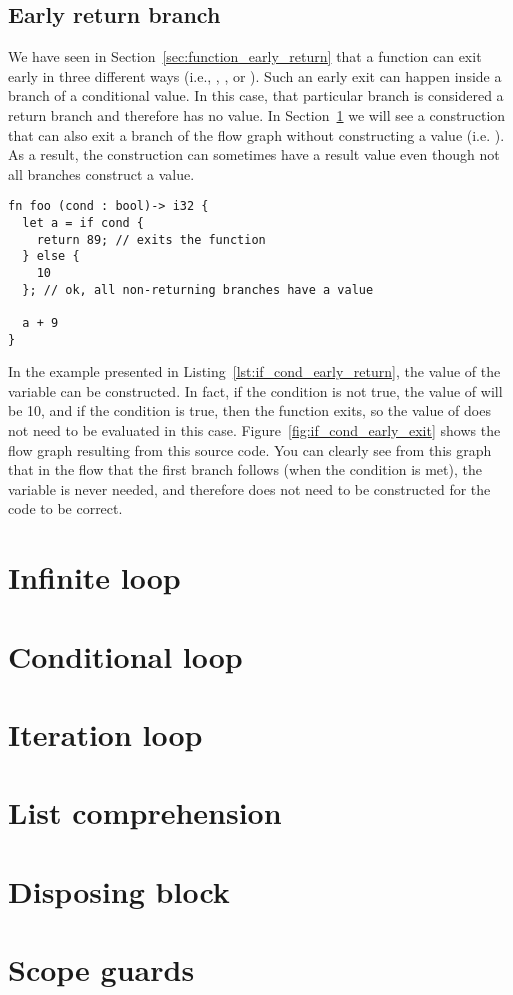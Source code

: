 \subsection{Early return branch}


We have seen in Section~\ref{sec:function_early_return} that a function can exit
early in three different ways (i.e., , , or
). Such an early exit can happen inside a branch of a conditional
value. In this case, that particular branch is considered a return branch and
therefore has no value. In Section~\ref{sec:inf_loop} we will see a construction
that can also exit a branch of the flow graph without constructing a value (i.e.
). As a result, the  construction can sometimes have a
result value even though not all branches construct a value.

\smallskip

\begin{lstlisting}[style=coloredverbatim, caption=Early return in \token{if} condition, label=lst:if_cond_early_return]
fn foo (cond : bool)-> i32 {
  let a = if cond {
    return 89; // exits the function
  } else {
    10
  }; // ok, all non-returning branches have a value

  a + 9
}
\end{lstlisting}

In the example presented in Listing~\ref{lst:if_cond_early_return}, the value of
the variable  can be constructed. In fact, if the condition is not
true, the value of  will be 10, and if the condition is true, then the
function exits, so the value of  does not need to be evaluated in this
case. Figure~\ref{fig:if_cond_early_exit} shows the flow graph resulting from
this source code. You can clearly see from this graph that in the flow that the
first branch follows (when the condition is met), the variable  is
never needed, and therefore does not need to be constructed for the code to be
correct.



\section{Infinite loop}%
\label{sec:inf_loop}

\section{Conditional loop}%
\label{sec:while_loop}

\section{Iteration loop}%
\label{sec:for_loop}

\section{List comprehension}%
\label{sec:list_compr}

\section{Disposing block}%
\label{sec:with_block}

\section{Scope guards}%
\label{sec:scope_guards}
